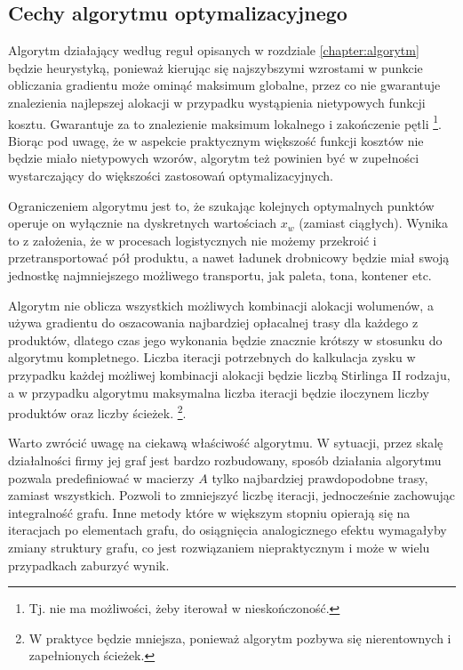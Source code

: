 \documentclass[polish, twoside, 12pt, a4paper]{article}
\theoremstyle{definition}
\theoremstyle{plain}
\theoremstyle{remark}
\begin{document}
\subsection{Cechy algorytmu optymalizacyjnego} \label{chapter:cechy}

Algorytm działający według reguł opisanych w rozdziale \ref{chapter:algorytm} będzie heurystyką, ponieważ kierując się najszybszymi wzrostami w punkcie obliczania gradientu może ominąć maksimum globalne, przez co nie gwarantuje znalezienia najlepszej alokacji w przypadku wystąpienia nietypowych funkcji kosztu. Gwarantuje za to znalezienie maksimum lokalnego i zakończenie pętli \footnote{Tj. nie ma możliwości, żeby iterował w nieskończoność.}. Biorąc pod uwagę, że w aspekcie praktycznym większość funkcji kosztów nie będzie miało nietypowych wzorów, algorytm też powinien być w zupełności wystarczający do większości zastosowań optymalizacyjnych.

Ograniczeniem algorytmu jest to, że szukając kolejnych optymalnych punktów operuje on wyłącznie na dyskretnych wartościach $x_w$ (zamiast ciągłych). Wynika to z założenia, że w procesach logistycznych nie możemy przekroić i przetransportować pół produktu, a nawet ładunek drobnicowy będzie miał swoją jednostkę najmniejszego możliwego transportu, jak paleta, tona, kontener etc. 

Algorytm nie oblicza wszystkich możliwych kombinacji alokacji wolumenów, a używa gradientu do oszacowania najbardziej opłacalnej trasy dla każdego z produktów, dlatego czas jego wykonania będzie znacznie krótszy w stosunku do algorytmu kompletnego. Liczba iteracji potrzebnych do kalkulacja zysku w przypadku każdej możliwej kombinacji alokacji będzie liczbą Stirlinga II rodzaju, a w przypadku algorytmu maksymalna liczba iteracji będzie iloczynem liczby produktów oraz liczby ścieżek. \footnote{W praktyce będzie mniejsza, ponieważ algorytm pozbywa się nierentownych i zapełnionych ścieżek.}. 

Warto zwrócić uwagę na ciekawą właściwość algorytmu. W sytuacji, przez skalę działalności firmy jej graf jest bardzo rozbudowany, sposób działania algorytmu pozwala predefiniować w macierzy $A$ tylko najbardziej prawdopodobne trasy, zamiast wszystkich. Pozwoli to zmniejszyć liczbę iteracji, jednocześnie zachowując integralność grafu. Inne metody które w większym stopniu opierają się na iteracjach po elementach grafu, do osiągnięcia analogicznego efektu wymagałyby zmiany struktury grafu, co jest rozwiązaniem niepraktycznym i może w wielu przypadkach zaburzyć wynik. 
\end{document}
